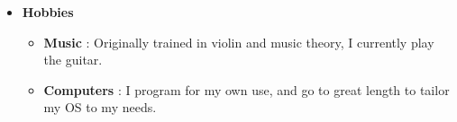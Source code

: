 \documentclass[11pt,a4paper,sans]{moderncv}        %
\begin{document}
\begin{itemize}
\vspace{6pt}

\item \textbf{Hobbies}
\begin{itemize}
\item \textbf{Music} : Originally trained in violin and music theory, I currently play the guitar.
\item \textbf{Computers} : I program for my own use, and go to great length to tailor my OS to my needs.
\end{itemize}
\end{itemize}


\nocite{*}



\end{document}
